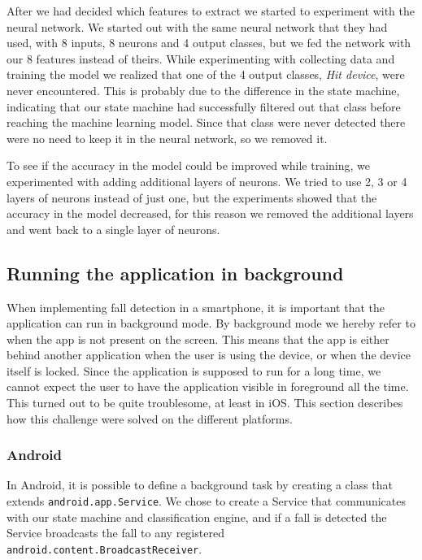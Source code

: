 \documentclass[12pt, a4paper, onecolumn]{article}
\begin{document}
	After we had decided which features to extract we started to experiment with the neural network. We started out with the same neural network that they had used, with 8 inputs, 8 neurons and 4 output classes, but we fed the network with our 8 features instead of theirs. While experimenting with collecting data and training the model we realized that one of the 4 output classes, \textit{Hit device}, were never encountered. This is probably due to the difference in the state machine, indicating that our state machine had successfully filtered out that class before reaching the machine learning model. Since that class were never detected there were no need to keep it in the neural network, so we removed it.
	
	To see if the accuracy in the model could be improved while training, we experimented with adding additional layers of neurons. We tried to use 2, 3 or 4 layers of neurons instead of just one, but the experiments showed that the accuracy in the model decreased, for this reason we removed the additional layers and went back to a single layer of neurons.
	
	\subsection{Running the application in background}
	
	When implementing fall detection in a smartphone, it is important that the application can run in background mode. By background mode we hereby refer to when the app is not present on the screen. This means that the app is either behind another application when the user is using the device, or when the device itself is locked. Since the application is supposed to run for a long time, we cannot expect the user to have the application visible in foreground all the time. This turned out to be quite troublesome, at least in iOS. This section describes how this challenge were solved on the different platforms.
	
	\subsubsection{Android}
	
	In Android, it is possible to define a background task by creating a class that extends \texttt{android.app.Service}. We chose to create a Service that communicates with our state machine and classification engine, and if a fall is  detected the Service broadcasts the fall to any registered \\ \texttt{android.content.BroadcastReceiver}.
	
\end{document}
